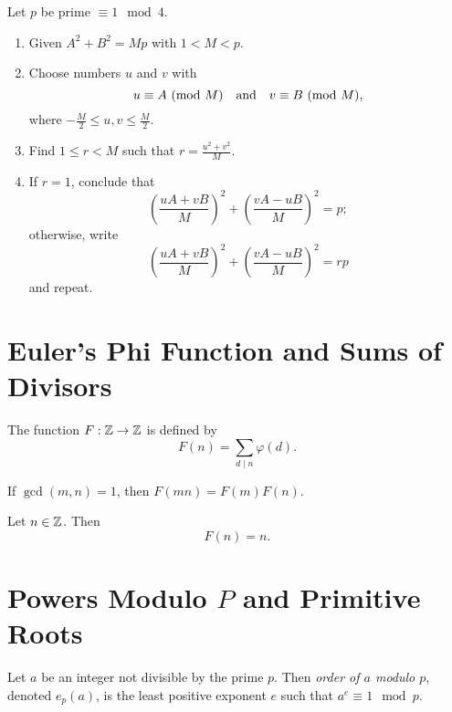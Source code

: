 \documentclass[10pt]{article}
\begin{document}
\begin{algorithm*}[\textcolor{red}{Method of Descent}] 
    Let $p$ be prime $\equiv 1 \mod{4}$.
    \begin{enumerate}[label=(\roman*),leftmargin=*]
        \item Given $A^2 + B^2 = Mp$ with $1<M<p$.
        \item Choose numbers $u$ and $v$ with 
            \[u \equiv A \mod{M} \quad \textnormal{and} \quad v \equiv B \mod{M},\]
            where $-\tfrac{M}{2} \leq u,v \leq \tfrac{M}{2}$.
        \item Find $1 \leq r < M$ such that $r=\frac{u^2+v^2}{M}$.    
    \item If $r=1$, conclude that 
            \[\left(\frac{uA+vB}{M}\right)^2 + \left(\frac{vA-uB}{M}\right)^2 = p;\]
            otherwise, write
            \[\left(\frac{uA+vB}{M}\right)^2 + \left(\frac{vA-uB}{M}\right)^2 = rp\]
            and repeat.
    \end{enumerate}
\end{algorithm*}


\setcounter{section}{26}
\section{Euler's Phi Function and Sums of Divisors}

\begin{definition*}
    The function $F:\Z \to \Z$ is defined by
    \[F(n)= \sum_{d \mid n} \varphi(d).\]
\end{definition*}

\begin{lemma}If $\gcd(m,n)=1$, then $F(mn)=F(m)F(n)$.
\end{lemma}

\begin{theorem}[\textcolor{red}{Euler's Phi Function Summation Formula}]
Let $n\in \Z$. Then
    \[F(n)=n.\]
\end{theorem}


\section{Powers Modulo $P$ and Primitive Roots}

\begin{definition*}[\textcolor{red}{Order of $a$ modulo $p$}]
    Let $a$ be an integer not divisible by the prime $p$. Then \textit{order of $a$ modulo $p$}, denoted $e_p(a)$, is the least positive exponent $e$ such that $a^e \equiv 1 \mod{p}$. 
\end{definition*}
\end{document}
